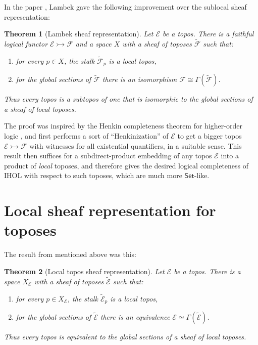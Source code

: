 \documentclass[12pt]{article}
\newcommand{\E}{\ensuremath{\mathcal{E}}}
\newcommand{\Set}{\ensuremath{\mathsf{Set}}}
\newcommand{\mono}{\ensuremath{\rightarrowtail}}
\newtheorem*{theorem*}{Theorem}
\theoremstyle{remark}
\theoremstyle{definition}
\begin{document}
In the paper \cite{L1}, Lambek gave the following improvement over the sublocal sheaf representation:

\begin{theorem*}[Lambek sheaf representation]
Let $\E$ be a topos.  
There is a faithful logical functor $\E\rightarrowtail\mathcal{F}$ 
and a space $X$ with a sheaf of toposes 
$\widetilde{\mathcal{F}}$ such that:
\begin{enumerate}
\item for every $p\in X$, the stalk $\widetilde{\mathcal{F}}_p$ is a  local topos, 
\item for the global sections of $\widetilde{\mathcal{F}}$ there is an isomorphism $\mathcal{F} \cong \Gamma(\widetilde{\mathcal{F}}) $.
\end{enumerate}
Thus every topos is a  subtopos of one that is isomorphic to the global sections of a sheaf of  local toposes.  
\end{theorem*}
\medskip
%
The proof was inspired by the Henkin completeness theorem for higher-order logic \cite{H}, and first performs a sort of ``Henkinization'' of $\E$ to get a bigger topos $\E\mono \mathcal{F}$ with witnesses for all existential quantifiers, in a suitable sense. This result then suffices for a subdirect-product embedding of any topos $\E$ into a product of \emph{local} toposes, and therefore gives the desired logical completeness of IHOL with respect to such toposes, which are much more $\Set$-like.

\section{Local sheaf representation for toposes}\label{section:localtopos}

The result from \cite{A} mentioned above was this:

\begin{theorem*}[Local topos sheaf representation]\label{theorem:local}
Let $\E$ be a topos.  
There is a space $X_\E$ with a sheaf of toposes $\widetilde{\E}$ such that:
\begin{enumerate}
\item for every $p\in X_\E$, the stalk $\widetilde{\E}_p$ is a local topos, 
\item for the global sections of $\widetilde{\E}$  there is an equivalence $\E\simeq \Gamma(\widetilde{\E})$.
\end{enumerate}
Thus every topos is equivalent to the global sections of a sheaf of local toposes.  
\end{theorem*}
\end{document}
